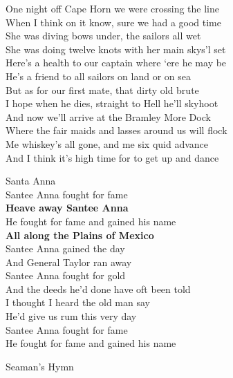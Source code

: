 \documentclass[letterpaper,9pt]{article}
\begin{document}
One night off Cape Horn we were crossing the line \\
When I think on it know, sure we had a good time \\
She was diving bows under, the sailors all wet \\
She was doing twelve knots with her main skys’l set \\

Here’s a health to our captain where ‘ere he may be \\
He’s a friend to all sailors on land or on sea \\
But as for our first mate, that dirty old brute \\
I hope when he dies, straight to Hell he’ll skyhoot \\

And now we’ll arrive at the Bramley More Dock \\
Where the fair maids and lasses around us will flock \\
Me whiskey’s all gone, and me six quid advance \\
And I think it’s high time for to get up and dance \\

\newpage
{}
\Huge
Santa Anna\\

\huge
Santee Anna fought for fame \\
\textbf{Heave away Santee Anna} \\
He fought for fame and gained his name \\
\textbf{All along the Plains of Mexico} \\

Santee Anna gained the day \\
And General Taylor ran away \\

Santee Anna fought for gold \\
And the deeds he'd done have oft been told \\

I thought I heard the old man say \\
He'd give us rum this very day \\

Santee Anna fought for fame \\
He fought for fame and gained his name \\

\newpage
{}
\Huge
Seaman's Hymn\\
\end{document}
